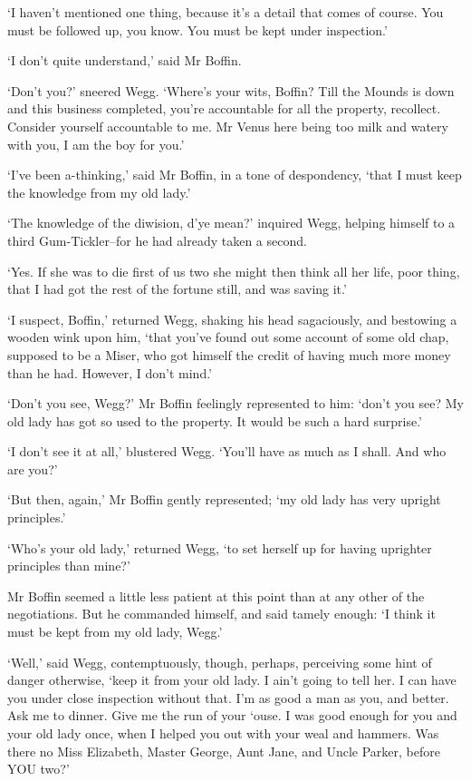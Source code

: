 ‘I haven’t mentioned one thing, because it’s a detail that comes of
course. You must be followed up, you know. You must be kept under
inspection.’

‘I don’t quite understand,’ said Mr Boffin.

‘Don’t you?’ sneered Wegg. ‘Where’s your wits, Boffin? Till the Mounds
is down and this business completed, you’re accountable for all the
property, recollect. Consider yourself accountable to me. Mr Venus here
being too milk and watery with you, I am the boy for you.’

‘I’ve been a-thinking,’ said Mr Boffin, in a tone of despondency, ‘that
I must keep the knowledge from my old lady.’

‘The knowledge of the diwision, d’ye mean?’ inquired Wegg, helping
himself to a third Gum-Tickler--for he had already taken a second.

‘Yes. If she was to die first of us two she might then think all her
life, poor thing, that I had got the rest of the fortune still, and was
saving it.’

‘I suspect, Boffin,’ returned Wegg, shaking his head sagaciously, and
bestowing a wooden wink upon him, ‘that you’ve found out some account
of some old chap, supposed to be a Miser, who got himself the credit of
having much more money than he had. However, I don’t mind.’

‘Don’t you see, Wegg?’ Mr Boffin feelingly represented to him: ‘don’t
you see? My old lady has got so used to the property. It would be such a
hard surprise.’

‘I don’t see it at all,’ blustered Wegg. ‘You’ll have as much as I
shall. And who are you?’

‘But then, again,’ Mr Boffin gently represented; ‘my old lady has very
upright principles.’

‘Who’s your old lady,’ returned Wegg, ‘to set herself up for having
uprighter principles than mine?’

Mr Boffin seemed a little less patient at this point than at any other
of the negotiations. But he commanded himself, and said tamely enough:
‘I think it must be kept from my old lady, Wegg.’

‘Well,’ said Wegg, contemptuously, though, perhaps, perceiving some hint
of danger otherwise, ‘keep it from your old lady. I ain’t going to tell
her. I can have you under close inspection without that. I’m as good a
man as you, and better. Ask me to dinner. Give me the run of your ‘ouse.
I was good enough for you and your old lady once, when I helped you out
with your weal and hammers. Was there no Miss Elizabeth, Master George,
Aunt Jane, and Uncle Parker, before YOU two?’

